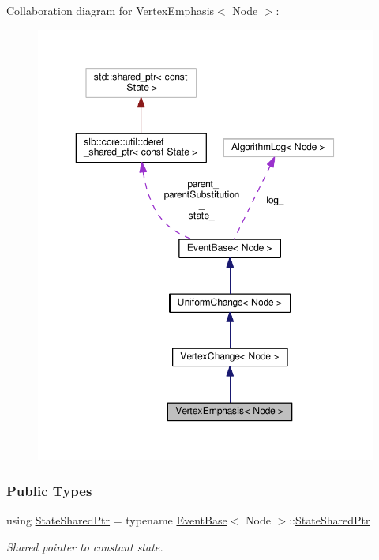 Collaboration diagram for Vertex\+Emphasis$<$ Node $>$\+:\nopagebreak
\begin{figure}[H]
\begin{center}
\leavevmode
\includegraphics[width=350pt]{structVertexEmphasis__coll__graph}
\end{center}
\end{figure}
\subsubsection*{Public Types}
\begin{DoxyCompactItemize}
\item 
using \hyperlink{structVertexEmphasis_a2bd76cddd90dbcd34543c881cae07645}{State\+Shared\+Ptr} = typename \hyperlink{structEventBase}{Event\+Base}$<$ Node $>$\+::\hyperlink{structEventBase_a2c0edb5cda08ce1965f3440a97b3fc87}{State\+Shared\+Ptr}\hypertarget{structVertexEmphasis_a2bd76cddd90dbcd34543c881cae07645}{}\label{structVertexEmphasis_a2bd76cddd90dbcd34543c881cae07645}

\begin{DoxyCompactList}\small\item\em Shared pointer to constant state. \end{DoxyCompactList}\end{DoxyCompactItemize}
